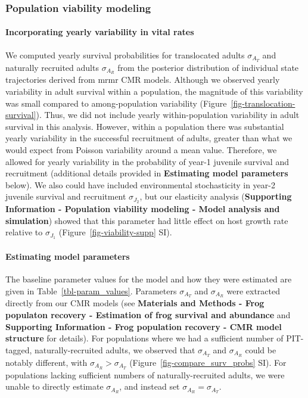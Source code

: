 \documentclass[
  letterpaper,
  DIV=11,
  numbers=noendperiod]{scrartcl}
\let\oldparagraph\paragraph
\renewcommand{\paragraph}[1]{\oldparagraph{#1}\mbox{}}
\begin{document}
\hypertarget{population-viability-modeling-1}{%
\subsubsection{Population viability
modeling}\label{population-viability-modeling-1}}

\hypertarget{incorporating-yearly-variability-in-vital-rates}{%
\paragraph{Incorporating yearly variability in vital
rates}\label{incorporating-yearly-variability-in-vital-rates}}

We computed yearly survival probabilities for translocated adults
\(\sigma_{A_T}\) and naturally recruited adults \(\sigma_{A_R}\) from
the posterior distribution of individual state trajectories derived from
mrmr CMR models. Although we observed yearly variability in adult
survival within a population, the magnitude of this variability was
small compared to among-population variability
(Figure~\ref{fig-translocation-survival}). Thus, we did not include
yearly within-population variability in adult survival in this analysis.
However, within a population there was substantial yearly variability in
the successful recruitment of adults, greater than what we would expect
from Poisson variability around a mean value. Therefore, we allowed for
yearly variability in the probability of year-1 juvenile survival and
recruitment (additional details provided in \textbf{Estimating model
parameters} below). We also could have included environmental
stochasticity in year-2 juvenile survival and recruitment
\(\sigma_{J_2}\), but our elasticity analysis (\textbf{Supporting
Information - Population viability modeling - Model analysis and
simulation}) showed that this parameter had little effect on host growth
rate relative to \(\sigma_{J_1}\) (Figure~\ref{fig-viability-supp} SI).

\hypertarget{estimating-model-parameters}{%
\paragraph{Estimating model
parameters}\label{estimating-model-parameters}}

The baseline parameter values for the model and how they were estimated
are given in Table~\ref{tbl-param_values}. Parameters \(\sigma_{A_T}\)
and \(\sigma_{A_R}\) were extracted directly from our CMR models (see
\textbf{Materials and Methods - Frog populaton recovery - Estimation of
frog survival and abundance} and \textbf{Supporting Information - Frog
population recovery - CMR model structure} for details). For populations
where we had a sufficient number of PIT-tagged, naturally-recruited
adults, we observed that \(\sigma_{A_T}\) and \(\sigma_{A_R}\) could be
notably different, with \(\sigma_{A_R} > \sigma_{A_T}\)
(Figure~\ref{fig-compare_surv_probs} SI). For populations lacking
sufficient numbers of naturally-recruited adults, we were unable to
directly estimate \(\sigma_{A_R}\), and instead set
\(\sigma_{A_R} = \sigma_{A_T}\).
\end{document}
